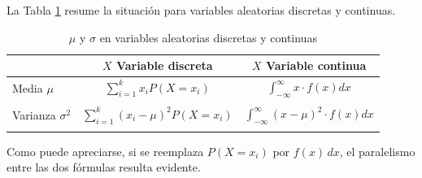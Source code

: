     \begin{center}
    \end{center}
La Tabla \ref{cap05:tablas:MuSigmaFormulasDosTiposVariables} resume la situación para variables aleatorias discretas y continuas.
\begin{table}[h]
    \begin{center}
    \begin{tabular}{|l|c|c|}
    \hline
                        & $X$ Variable discreta& $X$ Variable continua                                                                            \\
    \hline
    Media $\mu$\rule{0cm}{1cm}& $\displaystyle\sum_{i=1}^k x_iP(X=x_i)$         & $\displaystyle \int_{-\infty}^{\infty} x\cdot f(x)dx$         \\
    &&\\
    \hline
    Varianza $\sigma^2$ \rule{0cm}{1cm}& $\displaystyle\sum_{i=1}^k (x_i-\mu)^2P(X=x_i)$ & $\displaystyle \int_{-\infty}^{\infty} (x-\mu)^2\cdot f(x)dx$ \\
    &&\\
    \hline
    \end{tabular}
    \end{center}
\caption{$\mu$ y $\sigma$ en variables aleatorias discretas y continuas}
\label{cap05:tablas:MuSigmaFormulasDosTiposVariables}
\end{table}

Como puede apreciarse, si se reemplaza $P(X=x_i)$ por $f(x)\,dx$, el paralelismo entre las dos fórmulas resulta evidente.

